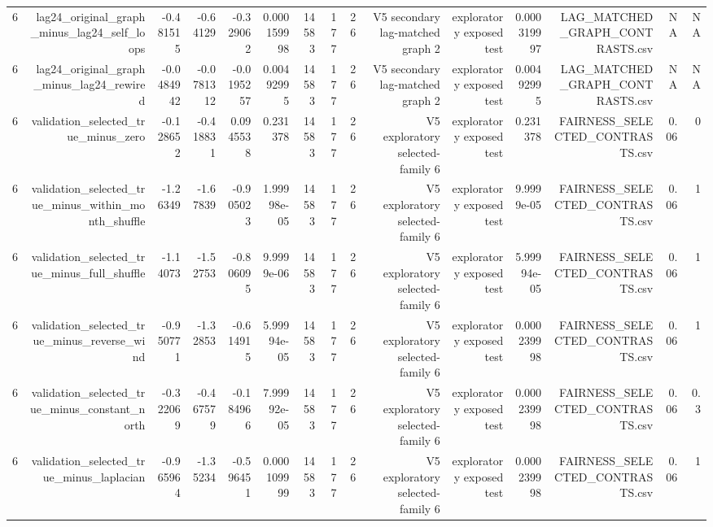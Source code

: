 \begin{tabular}{lrrrrrrrrrrrrrr}
6 & lag24\_original\_graph\_minus\_lag24\_self\_loops & -0.481515 & -0.64129 & -0.329062 & 0.000159998 & 14583 & 177 & 26 & V5 secondary lag-matched graph 2 & exploratory exposed test & 0.000319997 & LAG\_MATCHED\_GRAPH\_CONTRASTS.csv & NA & NA \\
6 & lag24\_original\_graph\_minus\_lag24\_rewired & -0.0484942 & -0.0781312 & -0.0195257 & 0.00492995 & 14583 & 177 & 26 & V5 secondary lag-matched graph 2 & exploratory exposed test & 0.00492995 & LAG\_MATCHED\_GRAPH\_CONTRASTS.csv & NA & NA \\
6 & validation\_selected\_true\_minus\_zero & -0.128652 & -0.418831 & 0.0945538 & 0.231378 & 14583 & 177 & 26 & V5 exploratory selected-family 6 & exploratory exposed test & 0.231378 & FAIRNESS\_SELECTED\_CONTRASTS.csv & 0.06 & 0 \\
6 & validation\_selected\_true\_minus\_within\_month\_shuffle & -1.26349 & -1.67839 & -0.905023 & 1.99998e-05 & 14583 & 177 & 26 & V5 exploratory selected-family 6 & exploratory exposed test & 9.9999e-05 & FAIRNESS\_SELECTED\_CONTRASTS.csv & 0.06 & 1 \\
6 & validation\_selected\_true\_minus\_full\_shuffle & -1.14073 & -1.52753 & -0.806095 & 9.9999e-06 & 14583 & 177 & 26 & V5 exploratory selected-family 6 & exploratory exposed test & 5.99994e-05 & FAIRNESS\_SELECTED\_CONTRASTS.csv & 0.06 & 1 \\
6 & validation\_selected\_true\_minus\_reverse\_wind & -0.950771 & -1.32853 & -0.614915 & 5.99994e-05 & 14583 & 177 & 26 & V5 exploratory selected-family 6 & exploratory exposed test & 0.000239998 & FAIRNESS\_SELECTED\_CONTRASTS.csv & 0.06 & 1 \\
6 & validation\_selected\_true\_minus\_constant\_north & -0.322069 & -0.467579 & -0.184966 & 7.99992e-05 & 14583 & 177 & 26 & V5 exploratory selected-family 6 & exploratory exposed test & 0.000239998 & FAIRNESS\_SELECTED\_CONTRASTS.csv & 0.06 & 0.3 \\
6 & validation\_selected\_true\_minus\_laplacian & -0.965964 & -1.35234 & -0.596451 & 0.000109999 & 14583 & 177 & 26 & V5 exploratory selected-family 6 & exploratory exposed test & 0.000239998 & FAIRNESS\_SELECTED\_CONTRASTS.csv & 0.06 & 1 \\
\hline
\end{tabular}
